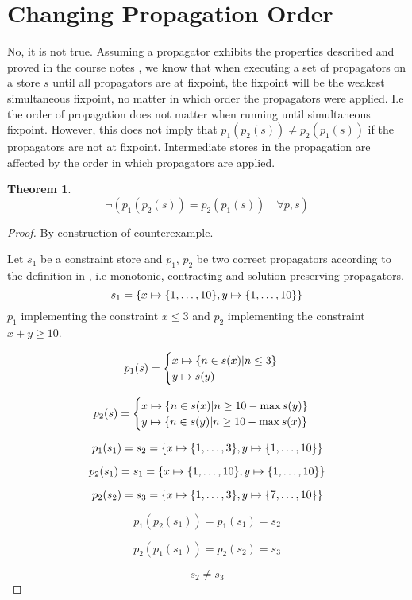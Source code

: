 \documentclass[a4paper, 11pt]{article}
\newtheorem{theorem}{Theorem}[section]
\newcommand\mymapsto{\mathrel{\ooalign{$\rightarrow$\cr%
      \kern-.15ex\raise.275ex\hbox{\scalebox{1}[0.522]{$\mid$}}\cr}}}
\begin{document}
\section*{Changing Propagation Order}
No, it is not true. Assuming a propagator exhibits the properties described and proved in the course notes \citep{schulte_notes}, we know that when executing a set of propagators on a store $s$ until all propagators are at fixpoint, the fixpoint will be the weakest simultaneous fixpoint, no matter in which order the propagators were applied. I.e the order of propagation does not matter when running until simultaneous fixpoint. However, this does not imply that $p_1(p_2(s)) \neq p_2(p_1(s))$ if the propagators are not at fixpoint. Intermediate stores in the propagation are affected by the order in which propagators are applied.

\begin{theorem}
$$\neg(p_1(p_2(s)) = p_2(p_1(s)) \quad \forall p, s)$$
\end{theorem}

\begin{proof}
By construction of counterexample.

  Let $s_1$ be a constraint store and $p_1$, $p_2$ be two correct propagators according to the definition in \citep{schulte_notes}, i.e monotonic, contracting and solution preserving propagators.
  $$s_1 = \{x \mymapsto \{1, \ldots, 10\}, y \mymapsto \{1, \ldots, 10\} \}$$
  $p_1$ implementing the constraint $x \leq 3$ and $p_2$ implementing the constraint $x+y \geq 10$.

\begin{gather*}
p_{1}(s) = 
\begin{cases}
  x \mymapsto \{n \in s(x) | n \leq 3 \}\\
  y \mymapsto s(y)\\
\end{cases}
\end{gather*}

\begin{gather*}
p_{2}(s) = 
\begin{cases}
  x \mymapsto \{n \in s(x) | n \geq 10 - \max s(y) \}\\
  y \mymapsto \{n \in s(y) | n \geq 10 - \max s(x) \}\\
\end{cases}
\end{gather*}

$$p_1(s_1) = s_2 = \{x \mymapsto \{1, \ldots, 3\}, y \mymapsto \{1, \ldots, 10\} \}$$

$$p_2(s_1) = s_1 = \{x \mymapsto \{1, \ldots, 10\}, y \mymapsto \{1, \ldots, 10\} \}$$

$$p_2(s_2) = s_3 = \{x \mymapsto \{1, \ldots, 3\}, y \mymapsto \{7, \ldots, 10\} \}$$

$$p_1(p_2(s_1)) = p_1(s_1) = s_2$$

$$p_2(p_1(s_1)) = p_2(s_2) = s_3$$

$$s_2 \neq s_3$$
\end{proof}
\end{document}
